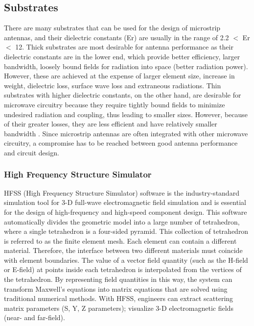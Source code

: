 \documentclass[12pt]{article}
\begin{document}
	         \cleardoublepage
				\subsection{Substrates}\label{sub:Substrates Characteristics}
		           \justify
		            There are many substrates that can be used for the design of microstrip antennas, and their dielectric constants (Er) are usually in the range of 2.2 $<$ Er $<$ 12. Thick substrates are most desirable for antenna performance as their dielectric constants are in the lower end, which provide better efficiency, larger bandwidth, loosely bound fields for radiation into space (better radiation power). However, these are achieved at the expense of larger element size, increase in weight, dielectric loss, surface wave loss and extraneous radiations. Thin substrates with higher dielectric constants, on the other hand, are desirable for microwave circuitry because they require tightly bound fields to minimize undesired radiation and coupling, thus leading to smaller sizes. However, because of their greater losses, they are less efficient and have relatively smaller bandwidth . Since microstrip antennas are often integrated with other microwave circuitry, a compromise has to be reached between good antenna performance and circuit design. 
	            
	           \subsubsection{High Frequency Structure Simulator }
	            \justify
	                HFSS (High Frequency Structure Simulator) software is the industry-standard simulation tool for 3-D full-wave electromagnetic field simulation and is essential for the design of high-frequency and high-speed component design. This software automatically divides the geometric model into a large number of tetrahedron, where a single tetrahedron is a four-sided pyramid. This collection of tetrahedron is referred to as the finite element mesh. Each element can contain a different material. Therefore, the interface between two different materials must coincide with element boundaries. The value of a vector field quantity (such as the H-field or E-field) at points inside each tetrahedron is interpolated from the vertices of the tetrahedron. By representing field quantities in this way, the system can transform Maxwell's equations into matrix equations that are solved using traditional numerical methods. With HFSS, engineers can extract scattering matrix parameters (S, Y, Z parameters); visualize 3-D electromagnetic fields (near- and far-field). 
	                
\end{document}
